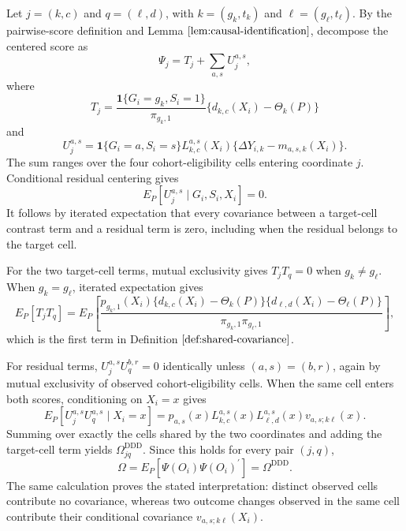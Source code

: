 Let \(j=(k,c)\) and \(q=(\ell,d)\), with \(k=(g_k,t_k)\) and \(\ell=(g_\ell,t_\ell)\).  By the pairwise-score definition and Lemma \(\ref{lem:causal-identification}\), decompose the centered score as
\[
 \Psi_j=T_j+\sum_{a,s}U_j^{a,s},
\]
where
\[
 T_j=\frac{\mathbf 1\{G_i=g_k,S_i=1\}}{\pi_{g_k,1}}
       \{d_{k,c}(X_i)-\Theta_k(P)\}
\]
and
\[
 U_j^{a,s}=\mathbf 1\{G_i=a,S_i=s\}L_{k,c}^{a,s}(X_i)
       \{\Delta Y_{i,k}-m_{a,s,k}(X_i)\}.
\]
The sum ranges over the four cohort-eligibility cells entering coordinate \(j\).  Conditional residual centering gives
\[
 E_P[U_j^{a,s}\mid G_i,S_i,X_i]=0.
\]
It follows by iterated expectation that every covariance between a target-cell contrast term and a residual term is zero, including when the residual belongs to the target cell.

For the two target-cell terms, mutual exclusivity gives \(T_jT_q=0\) when \(g_k\ne g_\ell\).  When \(g_k=g_\ell\), iterated expectation gives
\[
 E_P[T_jT_q]
 =E_P\!\left[
 \frac{p_{g_k,1}(X_i)
 \{d_{k,c}(X_i)-\Theta_k(P)\}
 \{d_{\ell,d}(X_i)-\Theta_\ell(P)\}}
 {\pi_{g_k,1}\pi_{g_\ell,1}}
 \right],
\]
which is the first term in Definition \(\ref{def:shared-covariance}\).

For residual terms, \(U_j^{a,s}U_q^{b,r}=0\) identically unless \((a,s)=(b,r)\), again by mutual exclusivity of observed cohort-eligibility cells.  When the same cell enters both scores, conditioning on \(X_i=x\) gives
\[
 E_P[U_j^{a,s}U_q^{a,s}\mid X_i=x]
 =p_{a,s}(x)L_{k,c}^{a,s}(x)L_{\ell,d}^{a,s}(x)
   v_{a,s;k\ell}(x).
\]
Summing over exactly the cells shared by the two coordinates and adding the target-cell term yields \(\Omega^{\mathrm{DDD}}_{jq}\).  Since this holds for every pair \((j,q)\),
\[
 \Omega=E_P[\Psi(O_i)\Psi(O_i)^{\prime}]=\Omega^{\mathrm{DDD}}.
\]
The same calculation proves the stated interpretation: distinct observed cells contribute no covariance, whereas two outcome changes observed in the same cell contribute their conditional covariance \(v_{a,s;k\ell}(X_i)\).